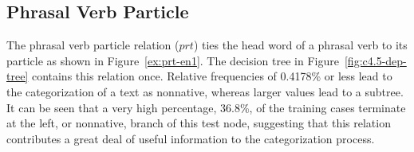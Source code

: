 \documentclass[main.tex]{subfiles}
\begin{document}

\subsection{Phrasal Verb Particle}

The phrasal verb particle relation ($prt$) ties the head word of a phrasal verb to its particle as shown in Figure~\ref{ex:prt-en1}. The decision tree in Figure~\ref{fig:c4.5-dep-tree} contains this relation once. Relative frequencies of 0.4178\% or less lead to the categorization of a text as nonnative, whereas larger values lead to a subtree. It can be seen that a very high percentage, 36.8\%, of the training cases terminate at the left, or nonnative, branch of this test node, suggesting that this relation contributes a great deal of useful information to the categorization process.
\end{document}
